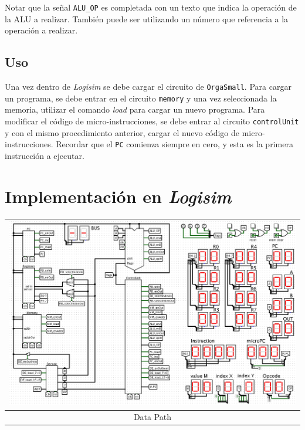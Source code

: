 \documentclass[a4paper,11pt]{article}
\begin{document}
\noindent Notar que la señal \verb|ALU_OP| es completada con un texto que indica la operación de la ALU a realizar. También puede ser utilizando un número que referencia a la operación a realizar.

\subsection*{Uso}

Una vez dentro de \emph{Logisim} se debe cargar el circuito de \texttt{OrgaSmall}.
Para cargar un programa, se debe entrar en el circuito \texttt{memory} y una vez seleccionada la memoria, utilizar el comando \emph{load} para cargar un nuevo programa.
Para modificar el código de micro-instrucciones, se debe entrar al circuito \texttt{controlUnit} y con el mismo procedimiento anterior, cargar el nuevo código de micro-instrucciones.
Recordar que el \texttt{PC} comienza siempre en cero, y esta es la primera instrucción a ejecutar.

\vspace{1cm}

\section*{Implementación en \emph{Logisim}}

\vspace{0.5cm}

\begin{center}
 \begin{tabular}[t]{c}
\includegraphics[scale=1.4]{img/0_dataPath.png} \\
\hline
Data Path \\ \hline
\end{tabular}
\end{center}
\end{document}
